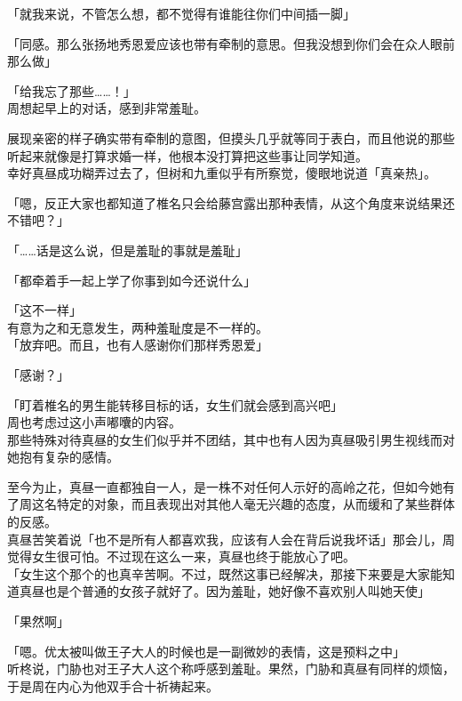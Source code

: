「就我来说，不管怎么想，都不觉得有谁能往你们中间插一脚」

「同感。那么张扬地秀恩爱应该也带有牵制的意思。但我没想到你们会在众人眼前那么做」

「给我忘了那些……！」\\

周想起早上的对话，感到非常羞耻。

展现亲密的样子确实带有牵制的意图，但摸头几乎就等同于表白，而且他说的那些听起来就像是打算求婚一样，他根本没打算把这些事让同学知道。\\

幸好真昼成功糊弄过去了，但树和九重似乎有所察觉，傻眼地说道「真亲热」。

「嗯，反正大家也都知道了椎名只会给藤宫露出那种表情，从这个角度来说结果还不错吧？」

「……话是这么说，但是羞耻的事就是羞耻」

「都牵着手一起上学了你事到如今还说什么」

「这不一样」\\

有意为之和无意发生，两种羞耻度是不一样的。\\

「放弃吧。而且，也有人感谢你们那样秀恩爱」

「感谢？」

「盯着椎名的男生能转移目标的话，女生们就会感到高兴吧」\\

周也考虑过这小声嘟囔的内容。\\

那些特殊对待真昼的女生们似乎并不团结，其中也有人因为真昼吸引男生视线而对她抱有复杂的感情。

至今为止，真昼一直都独自一人，是一株不对任何人示好的高岭之花，但如今她有了周这名特定的对象，而且表现出对其他人毫无兴趣的态度，从而缓和了某些群体的反感。\\

真昼苦笑着说「也不是所有人都喜欢我，应该有人会在背后说我坏话」那会儿，周觉得女生很可怕。不过现在这么一来，真昼也终于能放心了吧。\\

「女生这个那个的也真辛苦啊。不过，既然这事已经解决，那接下来要是大家能知道真昼也是个普通的女孩子就好了。因为羞耻，她好像不喜欢别人叫她天使」

「果然啊」

「嗯。优太被叫做王子大人的时候也是一副微妙的表情，这是预料之中」\\

听柊说，门胁也对王子大人这个称呼感到羞耻。果然，门胁和真昼有同样的烦恼，于是周在内心为他双手合十祈祷起来。\\

